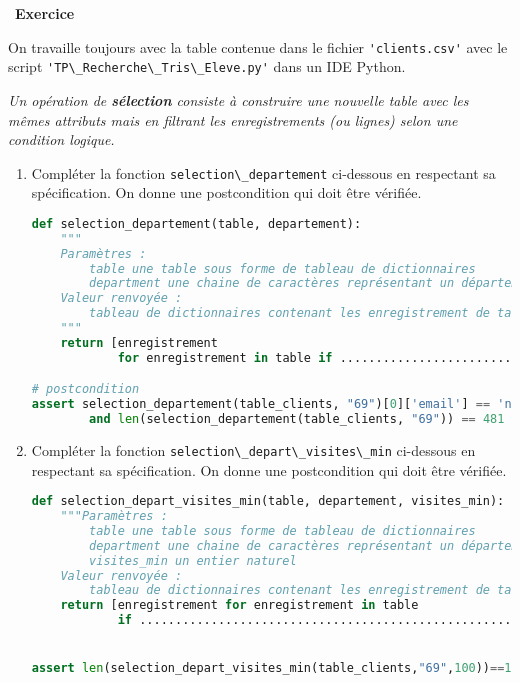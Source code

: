 \documentclass[
  11pt,
]{article}
\newcommand{\passthrough}[1]{#1}
\newcounter{exo}
\newenvironment{exercice}[1]
{\par \medskip   \addtocounter{exo}{1} \noindent  
\begin{bclogo}[arrondi =0.1,   noborder = true, logo=\bccrayon, marge=4]{~\textbf{Exercice} \textbf{\theexo} {\itshape #1} }  \par}
{
\end{bclogo}
 \par \bigskip }
\newcounter{def}
\newcounter{logi}
\begin{document}
\begin{exercice}{}

On travaille toujours avec la table contenue dans le fichier
\passthrough{\lstinline!'clients.csv'!} avec le script
\passthrough{\lstinline!'TP\_Recherche\_Tris\_Eleve.py'!} dans un IDE
Python.

\emph{Un opération de \textbf{sélection} consiste à construire une
nouvelle table avec les mêmes attributs mais en filtrant les
enregistrements (ou lignes) selon une condition logique.}

\begin{enumerate}
\def\labelenumi{\arabic{enumi}.}
\item
  Compléter la fonction \passthrough{\lstinline!selection\_departement!}
  ci-dessous en respectant sa spécification. On donne une postcondition
  qui doit être vérifiée.

\begin{lstlisting}[language=Python]
def selection_departement(table, departement):
    """
    Paramètres : 
        table une table sous forme de tableau de dictionnaires
        department une chaine de caractères représentant un département
    Valeur renvoyée :
        tableau de dictionnaires contenant les enregistrement de table dont l'attribut "département"  a la valeur passée en paramètre
    """
    return [enregistrement
            for enregistrement in table if ......................................    ]

# postcondition
assert selection_departement(table_clients, "69")[0]['email'] == 'nnguyen@noos.fr' \
        and len(selection_departement(table_clients, "69")) == 481
\end{lstlisting}
\item
  Compléter la fonction
  \passthrough{\lstinline!selection\_depart\_visites\_min!} ci-dessous
  en respectant sa spécification. On donne une postcondition qui doit
  être vérifiée.

\begin{lstlisting}[language=Python]
def selection_depart_visites_min(table, departement, visites_min):
    """Paramètres : 
        table une table sous forme de tableau de dictionnaires
        department une chaine de caractères représentant un département
        visites_min un entier naturel 
    Valeur renvoyée :
        tableau de dictionnaires contenant les enregistrement de table dont l'attribut "département"  a la valeur passée en paramètre et l'attribut visites est >= visites_min"""
    return [enregistrement for enregistrement in table 
            if ........................................................]         


assert len(selection_depart_visites_min(table_clients,"69",100))==171
\end{lstlisting}
\end{enumerate}

\end{exercice}
\end{document}
